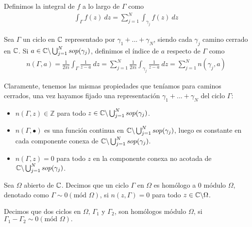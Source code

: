 \begin{defi}
    Definimos la integral de $f$ a lo largo de $\Gamma$ como
    \begin{align*}
        \int_{\Gamma} f(z) \ dz = \sum_{j=1}^{N} \int_{\gamma_j} f(z) \ dz
    \end{align*}
\end{defi}

\begin{defi}
    Sea $\Gamma$ un ciclo en $\mathbb{C}$ representado por $\gamma_1 + ... + \gamma_N$, siendo cada $\gamma_j$ camino cerrado en $\mathbb{C}$. Si $a \in \mathbb{C} \backslash \bigcup_{j=1}^{N} sop(\gamma_j)$, definimos el índice de $a$ respecto de $\Gamma$ como
    \begin{align*}
        n(\Gamma,a) = \frac{1}{2\pi i} \int_{\Gamma} \frac{1}{z-a} \ dz =  \sum_{j=1}^{N} \frac{1}{2\pi i} \int_{\gamma_j} \frac{1}{z-a} \ dz = \sum_{j=1}^{N} n(\gamma_j,a)
    \end{align*}
\end{defi}

\begin{obs}
    Claramente, tenemos las mismas propiedades que teníamos para caminos cerrados, una vez hayamos fijado una representación $\gamma_1 + ... + \gamma_N$ del ciclo $\Gamma$:
    \begin{itemize}
        \item $n(\Gamma,z) \in \mathbb{Z}$ para todo $z\in \mathbb{C} \backslash \bigcup_{j=1}^{N} sop(\gamma_j)$.
        \item $n(\Gamma,\bullet)$ es una función continua en $\mathbb{C} \backslash \bigcup_{j=1}^{N} sop(\gamma_j)$, luego es constante en cada componente conexa de $\mathbb{C} \backslash \bigcup_{j=1}^{N} sop(\gamma_j)$.
        \item $n(\Gamma,z) = 0$ para todo $z$ en la componente conexa no acotada de $\mathbb{C} \backslash \bigcup_{j=1}^{N} sop(\gamma_j)$.
    \end{itemize}
\end{obs}

\begin{defi}
    Sea $\Omega$ abierto de $\mathbb{C}$. Decimos que un ciclo $\Gamma$ en $\Omega$ es homólogo a 0 módulo $\Omega$, denotado como $\Gamma \sim 0 (\text{mód } \Omega)$, si $n(z,\Gamma) = 0$ para todo $z \in \mathbb{C} \backslash \Omega$.

    Decimos que dos ciclos en $\Omega$, $\Gamma_1$ y $\Gamma_2$, son homólogos módulo $\Omega$, si $\Gamma_1 - \Gamma_2 \sim 0 (\text{mód } \Omega).$
\end{defi}

